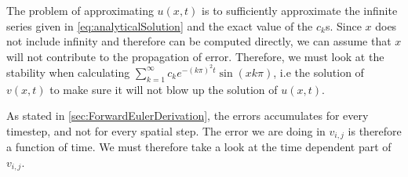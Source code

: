 \documentclass[12pt,english,a4paper]{article}
\begin{document}
The problem of approximating \(u(x,t)\) is to sufficiently approximate the infinite series given in \vref{eq:analyticalSolution} and the exact value of the \(c_k\)s. Since \( x\) does not include infinity and therefore can be computed directly, we can assume that \(x\) will not contribute to the propagation of error. Therefore, we must look at the stability when calculating \( \sum_{k=1}^\infty c_ke^{-(k\pi)^2t}\sin(xk\pi) \), i.e the solution of \(v(x,t)\) to make sure it will not blow up the solution of \(u(x,t)\).

As stated in \vref{sec:ForwardEulerDerivation}, the errors accumulates for every timestep, and not for every spatial step. The error we are doing in \(v_{i,j}\) is therefore a function of time. We must therefore take a look at the time dependent part of \(v_{i,j}\).
\end{document}
